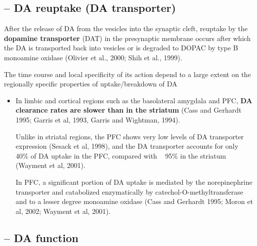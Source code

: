 \subsection{-- DA reuptake (DA transporter)}
\label{sec:DA-reuptake}
\label{sec:DA-transporter}

After the release of DA from the vesicles into the synaptic cleft, reuptake by
the {\bf dopamine transporter} (DAT) in the presynaptic membrane occurs after
which the DA is transported back into vesicles or is degraded to DOPAC by type B
monoamine oxidase (Olivier et al., 2000; Shih et al., 1999).

The time course and local specificity of its action depend to a large extent on
the regionally specific properties of uptake/breakdown of DA
\begin{itemize}
  
  \item  In limbic and cortical regions such as the basolateral amygdala and
  PFC, {\bf DA clearance rates are slower than in the striatum} (Cass and
  Gerhardt 1995; Garris et al, 1993, Garris and Wightman, 1994).
  
  Unlike in striatal regions, the PFC shows very low levels of DA transporter
  expression (Sesack et al, 1998), and the DA transporter accounts for only ~
  40\% of DA uptake in the PFC, compared with ~ 95\% in the striatum (Wayment et
  al, 2001).
  
  In PFC, a significant portion of DA uptake is mediated by the
  norepinephrine transporter and catabolized enzymatically by
  catechol-O-methyltransferase and to a lesser degree monoamine oxidase (Cass
  and Gerhardt 1995; Moron et al, 2002; Wayment et al, 2001).
  
\end{itemize}

\subsection{-- DA function}

